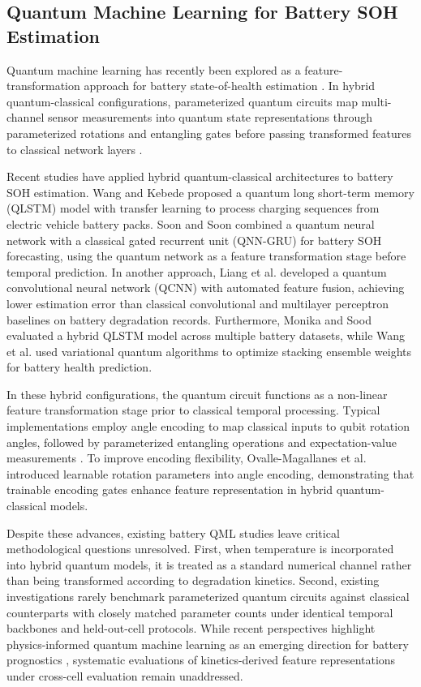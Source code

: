 \documentclass[a4paper,fleqn]{cas-sc}
\begin{document}
\subsection{Quantum Machine Learning for Battery SOH Estimation}\label{sec:rw-qml}
Quantum machine learning has recently been explored as a feature-transformation approach for battery state-of-health estimation \citep{komarsofla2026}. In hybrid quantum-classical configurations, parameterized quantum circuits map multi-channel sensor measurements into quantum state representations through parameterized rotations and entangling gates before passing transformed features to classical network layers \citep{biamonte2017,cerezo2021}.

Recent studies have applied hybrid quantum-classical architectures to battery SOH estimation. Wang and Kebede \citep{wang2026prediction} proposed a quantum long short-term memory (QLSTM) model with transfer learning to process charging sequences from electric vehicle battery packs. Soon and Soon \citep{soon2025hybrid} combined a quantum neural network with a classical gated recurrent unit (QNN-GRU) for battery SOH forecasting, using the quantum network as a feature transformation stage before temporal prediction. In another approach, Liang et al. \citep{liang2025stochastic} developed a quantum convolutional neural network (QCNN) with automated feature fusion, achieving lower estimation error than classical convolutional and multilayer perceptron baselines on battery degradation records. Furthermore, Monika and Sood \citep{monika2026multi} evaluated a hybrid QLSTM model across multiple battery datasets, while Wang et al. \citep{wang2024lithium} used variational quantum algorithms to optimize stacking ensemble weights for battery health prediction.

In these hybrid configurations, the quantum circuit functions as a non-linear feature transformation stage prior to classical temporal processing. Typical implementations employ angle encoding to map classical inputs to qubit rotation angles, followed by parameterized entangling operations and expectation-value measurements \citep{cerezo2021}. To improve encoding flexibility, Ovalle-Magallanes et al. \citep{ovalle2023quantum} introduced learnable rotation parameters into angle encoding, demonstrating that trainable encoding gates enhance feature representation in hybrid quantum-classical models.

Despite these advances, existing battery QML studies leave critical methodological questions unresolved. First, when temperature is incorporated into hybrid quantum models, it is treated as a standard numerical channel rather than being transformed according to degradation kinetics. Second, existing investigations rarely benchmark parameterized quantum circuits against classical counterparts with closely matched parameter counts under identical temporal backbones and held-out-cell protocols. While recent perspectives highlight physics-informed quantum machine learning as an emerging direction for battery prognostics \citep{piqml2026}, systematic evaluations of kinetics-derived feature representations under cross-cell evaluation remain unaddressed.
\end{document}
